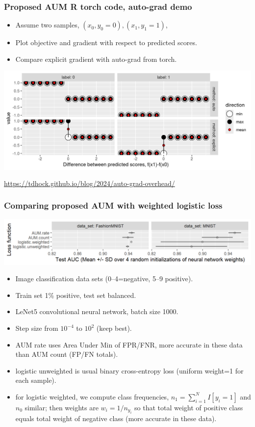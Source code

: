 \documentclass[t]{beamer}
\begin{document}
\begin{frame}[fragile]
  \frametitle{Proposed AUM R torch code, auto-grad demo}

  \begin{itemize}
  \item Assume two samples, $(x_0,y_0=0), (x_1,y_1=1)$,
  \item Plot objective and gradient with respect to predicted scores.
  \item Compare explicit gradient with auto-grad from torch.
  \end{itemize}

  \includegraphics[width=\textwidth]{autoVsExplicitSubGradients-1}

  \small
  \url{https://tdhock.github.io/blog/2024/auto-grad-overhead/}
\end{frame}

\begin{frame}
  \frametitle{Comparing proposed AUM with weighted logistic loss}
  \includegraphics[width=\textwidth]{figure-aum-neural-networks-test-auc}
  \begin{itemize}
  \item Image classification data sets (0--4=negative, 5--9 positive).
  \item Train set 1\% positive, test set balanced.
  \item LeNet5 convolutional neural network, batch size 1000.
  \item Step size from $10^{-4}$ to $10^2$ (keep best).
  \item AUM rate uses Area Under Min of FPR/FNR, more accurate in
    these data than AUM count (FP/FN totals).
  \item logistic unweighted is usual binary cross-entropy loss (uniform weight=1 for each sample). 
  \item for logistic weighted, we compute class frequencies, $n_1=\sum_{i=1}^N I[y_i=1]$ and $n_0$ similar; then weights are $w_i=1/n_{y_i}$ so that total weight of positive class equals total weight of negative class (more accurate in these data).
  \end{itemize}
\end{frame}
\end{document}
